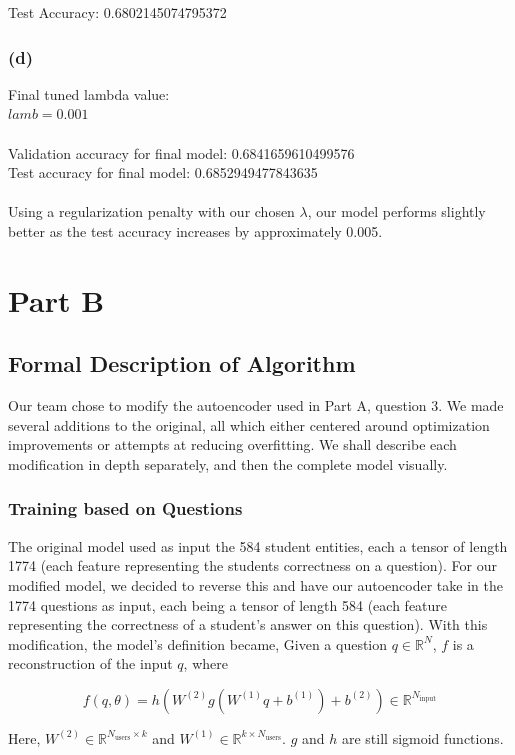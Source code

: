\documentclass{article}
\begin{document}
Test Accuracy: 0.6802145074795372
\subsubsection{(d)}
Final tuned lambda value:\\
$lamb = 0.001$\\
\\
Validation accuracy for final model: 0.6841659610499576\\
Test accuracy for final model: 0.6852949477843635\\
\\
Using a regularization penalty with our chosen $\lambda$, our model performs slightly better as the test accuracy increases by approximately 0.005.
\section{Part B}
\subsection{Formal Description of Algorithm}
Our team chose to modify the autoencoder used in Part A, question 3. We made several additions to the original, all which either centered around optimization improvements or attempts at reducing overfitting. We shall describe each modification in depth separately, and then the complete model visually.

\subsubsection{Training based on Questions}
The original model used as input the 584 student entities, each a tensor of length 1774 (each feature representing the students correctness on a question). For our modified model, we decided to reverse this and have our autoencoder take in the 1774 questions as input, each being a tensor of length 584 (each feature representing the correctness of a student's answer on this question). With this modification, the model's definition became,
Given a question $q \in \mathbb{R}^{N}$, $f$ is a reconstruction of the input $q$, where 

$$f(q, \theta) = h(W^{(2)}g(W^{(1)}q + b^{(1)}) + b^{(2)}) \in \mathbb{R}^{N_{\text{input}}}$$

\noindent Here, $W^{(2)} \in \mathbb{R}^{N_{\text{users}}\times k}$ and $W^{(1)} \in \mathbb{R}^{k\times N_{\text{users}}}$. $g$ and $h$ are still sigmoid functions. \\
\end{document}
